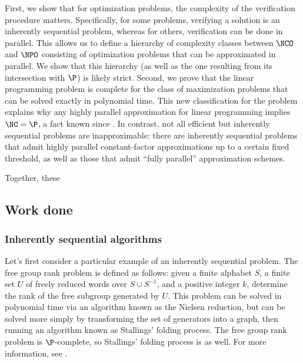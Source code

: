 \documentclass{article}
\begin{document}
%
%
%
First, we show that for optimization problems, the complexity of the verification procedure matters.
Specifically, for some problems, verifying a solution is an inherently sequential problem, whereas for others, verification can be done in parallel.
This allows us to define a hierarchy of complexity classes between $\NCO$ and $\NPO$ consisting of optimization problems that can be approximated in parallel.
We show that this hierarchy (as well as the one resulting from its intersection with $\P$) is likely strict.
Second, we prove that the linear programming problem is complete for the class of maximization problems that can be solved exactly in polynomial time.
This new classification for the problem explains why any highly parallel approximation for linear programming implies $\NC = \P$, a fact known since .
In contrast, not all efficient but inherently sequential problems are inapproximable: there are inherently sequential problems that admit highly parallel constant-factor approximations up to a certain fixed threshold, as well as those that admit ``fully parallel'' approximation schemes.

%
%
Together, these 
%



\subsection{Work done}

\subsubsection{Inherently sequential algorithms}

Let's first consider a particular example of an inherently sequential problem.
The free group rank problem is defined as follows: given a finite alphabet $S$, a finite set $U$ of freely reduced words over $S \cup S^{-1}$, and a positive integer $k$, determine the rank of the free subgroup generated by $U$.
This problem can be solved in polynomial time via an algorithm known as the Nielsen reduction, but can be solved more simply by transforming the set of generators into a graph, then running an algorithm known as Stallings' folding process.
The free group rank problem is $\P$-complete, so Stallings' folding process is as well.
For more information, see \autocite{stallings}.
\end{document}
